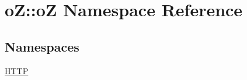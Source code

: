 \hypertarget{namespaceo_z_1_1o_z}{}\section{oZ\+::oZ Namespace Reference}
\label{namespaceo_z_1_1o_z}
\subsection*{Namespaces}
\begin{DoxyCompactItemize}
\item 
 \mbox{\hyperlink{namespaceo_z_1_1o_z_1_1_h_t_t_p}{H\+T\+TP}}
\end{DoxyCompactItemize}
